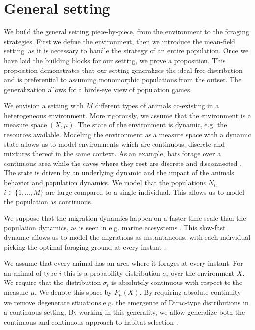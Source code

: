 \section{General setting}
\label{sec:general_setting}
We build the general setting piece-by-piece, from the environment to the foraging strategies. First we define the environment, then we introduce the mean-field setting, as it is necessary to handle the strategy of an entire population. Once we have laid the building blocks for our setting, we prove a proposition. This proposition demonstrates that our setting generalizes the ideal free distribution and is preferential to assuming monomorphic populations from the outset. The generalization allows for a birds-eye view of population games.

We envision a setting with $M$ different types of animals co-existing in a heterogeneous environment.  More rigorously, we assume that the environment is a measure space $(X,\mu)$. The state of the environment is dynamic, e.g. the resources available. Modeling the environment as a measure space with a dynamic state allows us to model environments which are continuous, discrete and mixtures thereof in the same context. As an example, bats forage over a continuous area while the caves where they rest are discrete and disconnected \citep{collet2019algorithmic}. The state is driven by an underlying dynamic and the impact of the animals behavior and population dynamics. We model that the populations $N_i$, $i\in \{1,\dots,M\}$  are large compared to a single individual. This allows us to model the population as continuous. %


We suppose that the migration dynamics happen on a faster time-scale than the population dynamics, as is seen in e.g. marine ecosystems \citep{iwasa1982vertical}. This slow-fast dynamic allows us to model the migrations as instantaneous, with each individual picking the optimal foraging ground at every instant \citep{kvrivan2013behavioral, cressman2006migration}.


We assume that every animal has an area where it forages at every instant. For an animal of type $i$ this is a probability distribution $\sigma_i$ over the environment $X$. We require that the distribution $\sigma_i$ is absolutely continuous with respect to the measure $\mu$. We denote this space by $P_{\mu}(X)$. By requiring absolute continuity we remove degenerate situations e.g. the emergence of Dirac-type distributions in a continuous setting. By working in this generality, we allow generalize both the continuous and continuous approach to habitat selection \citep{fretwell1969territorial, broom2013game, verticalmigration}.


